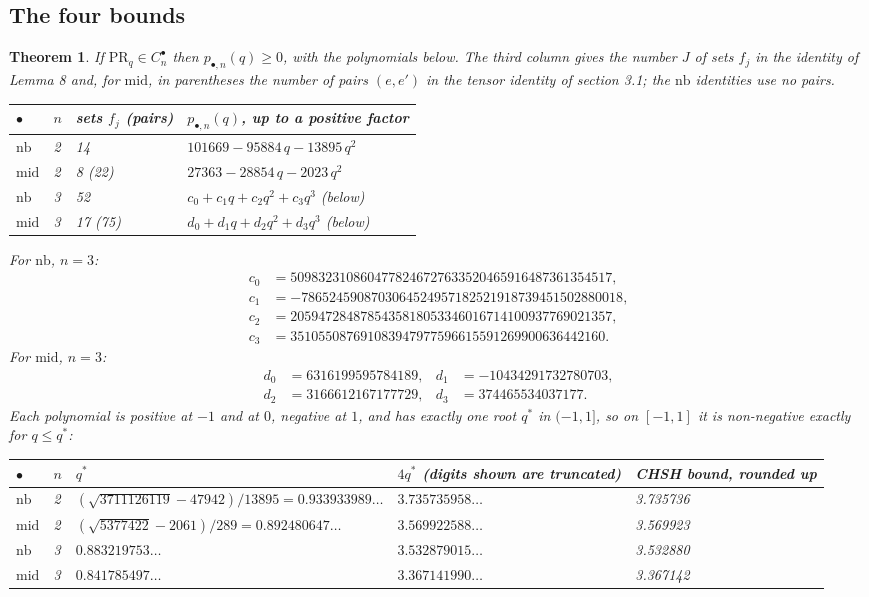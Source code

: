 \documentclass[11pt,a4paper]{article}
\newtheorem{theorem}{Theorem}
\theoremstyle{definition}
\theoremstyle{remark}
\newcommand{\PR}{\mathrm{PR}}
\newcommand{\nb}{\mathrm{nb}}
\newcommand{\md}{\mathrm{mid}}
\newcommand{\ps}{\bullet}
\begin{document}
\subsection{The four bounds}

\begin{theorem}\label{t:bounds}
If $\PR_q \in C_n^{\ps}$ then $p_{\ps,n}(q) \ge 0$, with the polynomials below. The third column gives the number $J$ of sets $f_j$ in the identity of Lemma 8 and, for $\md$, in parentheses the number of pairs $(e, e')$ in the tensor identity of section 3.1; the $\nb$ identities use no pairs.
\begin{center}
\upshape
\begin{tabular}{llll}
\toprule
$\ps$ & $n$ & sets $f_j$ (pairs) & $p_{\ps,n}(q)$, up to a positive factor \\
\midrule
$\nb$ & 2 & 14 & $101669 - 95884\, q - 13895\, q^2$ \\
$\md$ & 2 & 8 (22) & $27363 - 28854\, q - 2023\, q^2$ \\
$\nb$ & 3 & 52 & $c_0 + c_1 q + c_2 q^2 + c_3 q^3$ (below) \\
$\md$ & 3 & 17 (75) & $d_0 + d_1 q + d_2 q^2 + d_3 q^3$ (below) \\
\bottomrule
\end{tabular}
\end{center}
For $\nb$, $n = 3$:
\begin{align*}
  c_0 &= 5098323108604778246727633520465916487361354517, \\
  c_1 &= -7865245908703064524957182521918739451502880018, \\
  c_2 &= 2059472848785435818053346016714100937769021357, \\
  c_3 &= 351055087691083947977596615591269900636442160.
\end{align*}
For $\md$, $n = 3$:
\begin{align*}
  d_0 &= 6316199595784189, & d_1 &= -10434291732780703, \\
  d_2 &= 3166612167177729, & d_3 &= 374465534037177.
\end{align*}
Each polynomial is positive at $-1$ and at $0$, negative at $1$, and has exactly one root $q^*$ in $(-1, 1]$, so on $[-1, 1]$ it is non-negative exactly for $q \le q^*$:
\begin{center}
\small\upshape
\begin{tabular}{llp{6.9cm}p{2.7cm}p{2.1cm}}
\toprule
$\ps$ & $n$ & $q^*$ & $4 q^*$ (digits shown are truncated) & CHSH bound, rounded up \\
\midrule
$\nb$ & 2 & $(\sqrt{3711126119} - 47942)/13895 = 0.933933989\ldots$ & $3.735735958\ldots$ & 3.735736 \\
$\md$ & 2 & $(\sqrt{5377422} - 2061)/289 = 0.892480647\ldots$ & $3.569922588\ldots$ & 3.569923 \\
$\nb$ & 3 & $0.883219753\ldots$ & $3.532879015\ldots$ & 3.532880 \\
$\md$ & 3 & $0.841785497\ldots$ & $3.367141990\ldots$ & 3.367142 \\
\bottomrule
\end{tabular}
\end{center}
\end{theorem}
\end{document}
